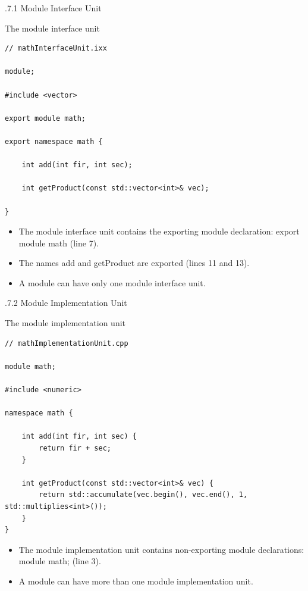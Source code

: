 .7.1\hspace{0.2cm} Module Interface Unit

\noindent
The module interface unit
\begin{lstlisting}[style=styleCXX]
// mathInterfaceUnit.ixx

module;

#include <vector>

export module math;

export namespace math {

	int add(int fir, int sec);
	
	int getProduct(const std::vector<int>& vec);

}
\end{lstlisting}

\begin{itemize}
\item 
The module interface unit contains the exporting module declaration: export module math (line 7).

\item 
The names add and getProduct are exported (lines 11 and 13).

\item 
A module can have only one module interface unit.
\end{itemize}

.7.2\hspace{0.2cm} Module Implementation Unit

\noindent
The module implementation unit
\begin{lstlisting}[style=styleCXX]
// mathImplementationUnit.cpp

module math;

#include <numeric>

namespace math {

	int add(int fir, int sec) {
		return fir + sec;
	}
	
	int getProduct(const std::vector<int>& vec) {
		return std::accumulate(vec.begin(), vec.end(), 1, std::multiplies<int>());
	}
}
\end{lstlisting}

\begin{itemize}
\item 
The module implementation unit contains non-exporting module declarations: module math; (line 3).

\item 
A module can have more than one module implementation unit.
\end{itemize}

